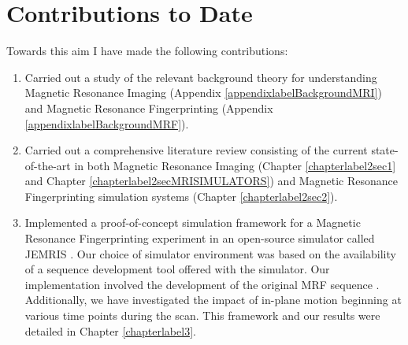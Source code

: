 \section{Contributions to Date}\label{chapterlabel4sec1}

Towards this aim I have made the following contributions:

\begin{enumerate}

	\item Carried out a study of the relevant background theory for understanding Magnetic Resonance Imaging (Appendix \ref{appendixlabelBackgroundMRI}) and Magnetic Resonance Fingerprinting (Appendix \ref{appendixlabelBackgroundMRF}).
	
	\item Carried out a comprehensive literature review consisting of the current state-of-the-art in both Magnetic Resonance Imaging (Chapter \ref{chapterlabel2sec1} and Chapter \ref{chapterlabel2secMRISIMULATORS}) and Magnetic Resonance Fingerprinting simulation systems (Chapter \ref{chapterlabel2sec2}).
	
	\item Implemented a proof-of-concept simulation framework for a Magnetic Resonance Fingerprinting experiment in an open-source simulator called JEMRIS \cite{Stocker2010}.
	Our choice of simulator environment was based on the availability of a sequence development tool offered with the simulator.
	Our implementation involved the development of the original MRF sequence \cite{Ma2013}.
	Additionally, we have investigated the impact of in-plane motion beginning at various time points during the scan.
	This framework and our results were detailed in Chapter \ref{chapterlabel3}.
	
\end{enumerate}